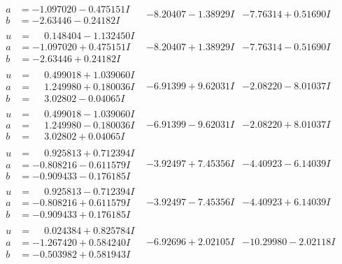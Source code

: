 \documentclass[1p]{elsarticle_modified}
\theoremstyle{definition}
\begin{document}
$$\begin{array}{c|c|c}
\begin{aligned}
a &= -1.097020 - 0.475151 I \\
b &= -2.63446 - 0.24182 I\end{aligned}
 & -8.20407 - 1.38929 I & -7.76314 + 0.51690 I \\ \hline\begin{aligned}
u &= \phantom{-}0.148404 - 1.132450 I \\
a &= -1.097020 + 0.475151 I \\
b &= -2.63446 + 0.24182 I\end{aligned}
 & -8.20407 + 1.38929 I & -7.76314 - 0.51690 I \\ \hline\begin{aligned}
u &= \phantom{-}0.499018 + 1.039060 I \\
a &= \phantom{-}1.249980 + 0.180036 I \\
b &= \phantom{-}3.02802 - 0.04065 I\end{aligned}
 & -6.91399 + 9.62031 I & -2.08220 - 8.01037 I \\ \hline\begin{aligned}
u &= \phantom{-}0.499018 - 1.039060 I \\
a &= \phantom{-}1.249980 - 0.180036 I \\
b &= \phantom{-}3.02802 + 0.04065 I\end{aligned}
 & -6.91399 - 9.62031 I & -2.08220 + 8.01037 I \\ \hline\begin{aligned}
u &= \phantom{-}0.925813 + 0.712394 I \\
a &= -0.808216 - 0.611579 I \\
b &= -0.909433 - 0.176185 I\end{aligned}
 & -3.92497 + 7.45356 I & -4.40923 - 6.14039 I \\ \hline\begin{aligned}
u &= \phantom{-}0.925813 - 0.712394 I \\
a &= -0.808216 + 0.611579 I \\
b &= -0.909433 + 0.176185 I\end{aligned}
 & -3.92497 - 7.45356 I & -4.40923 + 6.14039 I \\ \hline\begin{aligned}
u &= \phantom{-}0.024384 + 0.825784 I \\
a &= -1.267420 + 0.584240 I \\
b &= -0.503982 + 0.581943 I\end{aligned}
 & -6.92696 + 2.02105 I & -10.29980 - 2.02118 I \\ \hline\begin{aligned}

\end{aligned}
\end{array}$$
\end{document}
